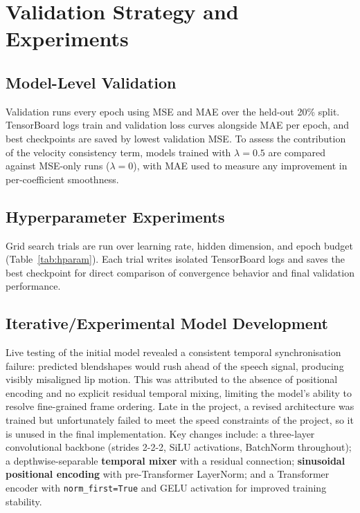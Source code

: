 \section{Validation Strategy and Experiments}

\subsection{Model-Level Validation}

Validation runs every epoch using MSE and MAE over the held-out 20\% split. TensorBoard logs train and validation loss curves alongside MAE per epoch, and best checkpoints are saved by lowest validation MSE. To assess the contribution of the velocity consistency term, models trained with $\lambda = 0.5$ are compared against MSE-only runs ($\lambda = 0$), with MAE used to measure any improvement in per-coefficient smoothness.

\subsection{Hyperparameter Experiments}

Grid search trials are run over learning rate, hidden dimension, and epoch budget (Table~\ref{tab:hparam}). Each trial writes isolated TensorBoard logs and saves the best checkpoint for direct comparison of convergence behavior and final validation performance.

\subsection{Iterative/Experimental Model Development}

Live testing of the initial model revealed a consistent temporal synchronisation failure: predicted blendshapes would rush ahead of the speech signal, producing visibly misaligned lip motion. This was attributed to the absence of positional encoding and no explicit residual temporal mixing, limiting the model's ability to resolve fine-grained frame ordering. Late in the project, a revised architecture was trained but unfortunately failed to meet the speed constraints of the project, so it is unused in the final implementation. Key changes include: a three-layer convolutional backbone (strides 2-2-2, SiLU activations, BatchNorm throughout); a depthwise-separable \textbf{temporal mixer} with a residual connection; \textbf{sinusoidal positional encoding} with pre-Transformer LayerNorm; and a Transformer encoder with \texttt{norm\_first=True} and GELU activation for improved training stability.

